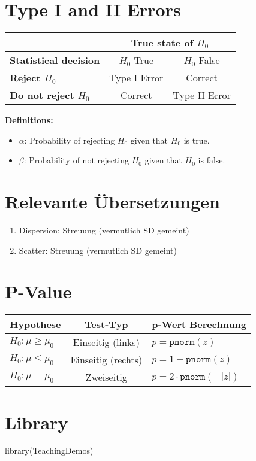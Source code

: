 
\section{Type I and II Errors}
\noindent
\begin{tabular}{|l|c|c|}
\hline
& \multicolumn{2}{c|}{\textbf{True state of } $H_0$}\\
\hline
\textbf{Statistical decision} & $H_0$ True & $H_0$ False\\
\hline
\textbf{Reject $H_0$} & Type I Error & Correct\\
\hline
\textbf{Do not reject $H_0$} & Correct & Type II Error\\
\hline
\end{tabular}

\textbf{Definitions:}
\begin{itemize}
    \item $\alpha$: Probability of rejecting $H_0$ given that $H_0$ is true.
    \item $\beta$: Probability of not rejecting $H_0$ given that $H_0$ is false.
\end{itemize}

\section{Relevante Übersetzungen}
\begin{enumerate}
    \item Dispersion: Streuung (vermutlich SD gemeint)
    \item Scatter: Streuung (vermutlich SD gemeint)
\end{enumerate}
\section{P-Value}
\noindent
\noindent
\begin{tabular}{lcl}
  \toprule
  \textbf{Hypothese}         & \textbf{Test-Typ}    & \textbf{p-Wert Berechnung} \\
  \midrule
  \(H_0: \mu \ge \mu_0\)      & Einseitig (links)   & \(p = \mathtt{pnorm}(z)\)   \\
  \(H_0: \mu \le \mu_0\)      & Einseitig (rechts)  & \(p = 1 - \mathtt{pnorm}(z)\) \\
  \(H_0: \mu = \mu_0\)        & Zweiseitig          & \(p = 2 \cdot \mathtt{pnorm}(-|z|)\) \\
  \bottomrule
\end{tabular}
\section{Library}
library(TeachingDemos)
\pagebreak




















